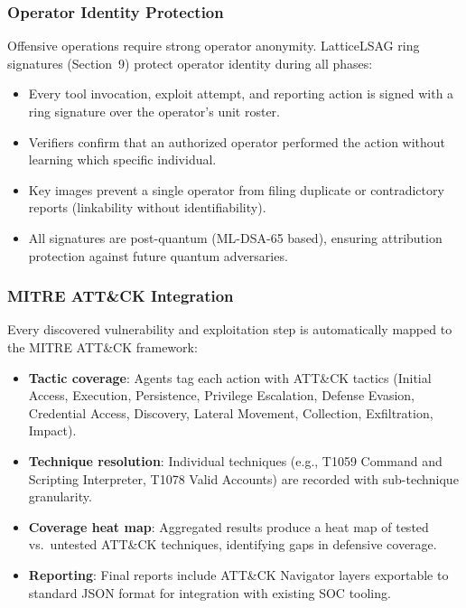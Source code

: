 \documentclass[11pt,letterpaper]{article}
\begin{document}
\subsubsection{Operator Identity Protection}

Offensive operations require strong operator anonymity. LatticeLSAG ring signatures (Section~9) protect operator identity during all phases:

\begin{itemize}
\item Every tool invocation, exploit attempt, and reporting action is signed with a ring signature over the operator's unit roster.
\item Verifiers confirm that an authorized operator performed the action without learning which specific individual.
\item Key images prevent a single operator from filing duplicate or contradictory reports (linkability without identifiability).
\item All signatures are post-quantum (ML-DSA-65 based), ensuring attribution protection against future quantum adversaries.
\end{itemize}

\subsubsection{MITRE ATT\&CK Integration}

Every discovered vulnerability and exploitation step is automatically mapped to the MITRE ATT\&CK framework:

\begin{itemize}
\item \textbf{Tactic coverage}: Agents tag each action with ATT\&CK tactics (Initial Access, Execution, Persistence, Privilege Escalation, Defense Evasion, Credential Access, Discovery, Lateral Movement, Collection, Exfiltration, Impact).
\item \textbf{Technique resolution}: Individual techniques (e.g., T1059 Command and Scripting Interpreter, T1078 Valid Accounts) are recorded with sub-technique granularity.
\item \textbf{Coverage heat map}: Aggregated results produce a heat map of tested vs.\ untested ATT\&CK techniques, identifying gaps in defensive coverage.
\item \textbf{Reporting}: Final reports include ATT\&CK Navigator layers exportable to standard JSON format for integration with existing SOC tooling.
\end{itemize}
\end{document}
